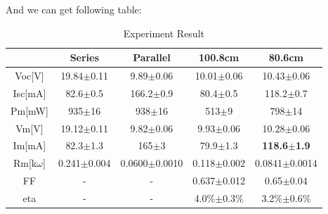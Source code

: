 \documentclass[12pt,a4paper]{article}
\begin{document}
And we can get following table:
\begin{table}[H]
    \centering
    \begin{tabular}{|c|c|c|c|c|}
    \hline
    & Series& Parallel & 100.8cm  & 80.6cm\\ \hline
    Voc[V] & 19.84$\pm$0.11 & 9.89$\pm$0.06 & 10.01$\pm$0.06  & 10.43$\pm$0.06  \\ \hline
    Isc[mA] & 82.6$\pm$0.5   & 166.2$\pm$0.9 & 80.4$\pm$0.5    & 118.2$\pm$0.7   \\ \hline
    Pm[mW]  & 935$\pm$16     & 938$\pm$16    & 513$\pm$9       & 798$\pm$14      \\ \hline
    Vm[V]  & 19.12$\pm$0.11 & 9.82$\pm$0.06 & 9.93$\pm$0.06   & 10.28$\pm$0.06 \\ \hline
    Im[mA]  & 82.3$\pm$1.3   & 165$\pm$3     & 79.9$\pm$1.3    & \textbf{118.6$\pm$1.9}   \\ \hline
    Rm[k$\omega$]  & 0.241$\pm$0.004  & 0.0600$\pm$0.0010 & 0.118$\pm$0.002   & 0.0841$\pm$0.0014   \\ \hline
    FF  & -  & - & 0.637$\pm$0.012 & 0.65$\pm$0.04   \\ \hline
    eta & -  & - & 4.0\%$\pm$0.3\% & 3.2\%$\pm$0.6\% \\ \hline
    \end{tabular}
    \caption{Experiment Result}
    \label{final}
\end{table}
\end{document}
